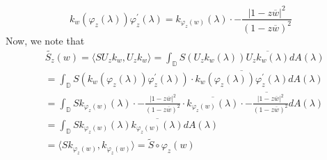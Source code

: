 \documentclass[12pt]{article}
\begin{document}
\[
k_w(\varphi_z(\lambda)) \varphi_z^\prime(\lambda) = k_{\varphi_z(w)}(\lambda) \cdot -\frac{\vert 1- z \overline{w} \vert^2}{(1 - z \overline{w})^2}
\] Now, we note that
\begin{align*}
&\widetilde{S_z}(w) = \langle SU_z k_w,  U_z k_w\rangle = \int_\mathbb{D} S(U_z k_w(\lambda)) \overline{U_z k_w(\lambda)} dA(\lambda) \\
&= \int_\mathbb{D} S(k_w(\varphi_z(\lambda)) \varphi_z^\prime(\lambda)) \cdot \overline{k_w(\varphi_z(\lambda)) \varphi_z^\prime(\lambda)} dA(\lambda) \\
&=  \int_\mathbb{D} Sk_{\varphi_z(w)}(\lambda) \cdot -\frac{\vert 1- z \overline{w} \vert^2}{(1 - z \overline{w})^2} \cdot \overline{k_{\varphi_z(w)}(\lambda)} \cdot  \overline{-\frac{\vert 1- z \overline{w} \vert^2}{(1 - z \overline{w})^2}} dA(\lambda) \\
&= \int_\mathbb{D} Sk_{\varphi_z(w)}(\lambda) \overline{k_{\varphi_z(w)}(\lambda)} dA(\lambda)\\  
&= \langle Sk_{\varphi_z(w)}, k_{\varphi_z(w)} \rangle = \tilde{S} \circ \varphi_z (w) 
\end{align*}
\end{document}
